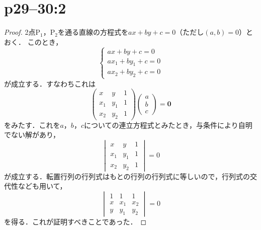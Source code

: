 \documentclass[a4paper,10pt,fleqn]{ltjsarticle}
\begin{document}
\section*{p29--30:2}

\begin{tleftbar}
    \begin{proof}
        2点$\mathrm{P}_1$，$\mathrm{P_2}$を通る直線の方程式を$ax+by+c=0$（ただし$(a,b)=0$）とおく．
        このとき，
        \[
            \begin{cases}
                ax+by+c =0       \\
                ax_1 + by_1 +c=0 \\
                ax_2 + by_2 +c =0
            \end{cases}
        \]
        が成立する．すなわちこれは
        \[
            \begin{pmatrix}
                x   & y   & 1 \\
                x_1 & y_1 & 1 \\
                x_2 & y_2 & 1
            \end{pmatrix}
            \begin{pmatrix}
                a \\
                b \\
                c
            \end{pmatrix}
            = \bm{0}
        \]
        をみたす．これを$a$，$b$，$c$についての連立方程式とみたとき，与条件により自明でない解があり，
        \[
            \begin{vmatrix}
                x   & y   & 1 \\
                x_1 & y_1 & 1 \\
                x_2 & y_2 & 1
            \end{vmatrix}
            =0
        \]
        が成立する．転置行列の行列式はもとの行列の行列式に等しいので，行列式の交代性なども用いて，
        \[
            \begin{vmatrix}
                1 & 1   & 1   \\
                x & x_1 & x_2 \\
                y & y_1 & y_2
            \end{vmatrix}
            =0
        \]
        を得る．これが証明すべきことであった．
    \end{proof}
\end{tleftbar}
\end{document}
